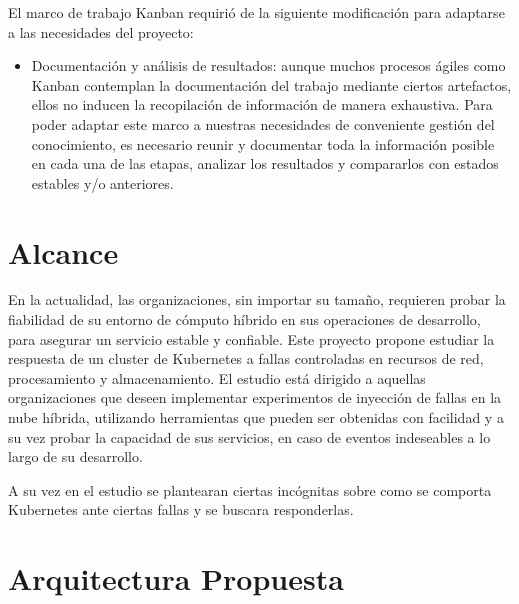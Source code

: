 \par El marco de trabajo Kanban requirió de la siguiente modificación para adaptarse a las necesidades del proyecto:
\begin{itemize}
    \item Documentación y análisis de resultados: aunque muchos procesos ágiles como Kanban contemplan la documentación del trabajo mediante ciertos artefactos, ellos no inducen la recopilación de información de manera exhaustiva. Para poder adaptar este marco a nuestras necesidades de conveniente gestión del conocimiento, es necesario reunir y documentar toda la información posible en cada una de las etapas, analizar los resultados y compararlos con estados estables y/o anteriores. 
\end{itemize}
 
\section{Alcance}


\par En la actualidad, las organizaciones, sin importar su tamaño, requieren probar la fiabilidad de su entorno de cómputo híbrido en sus operaciones de desarrollo, para asegurar un servicio estable y confiable. Este proyecto propone estudiar la respuesta de un cluster de Kubernetes a fallas controladas en recursos de red, procesamiento y almacenamiento. El estudio está dirigido a aquellas organizaciones que deseen implementar experimentos de inyección de fallas en la nube híbrida, utilizando herramientas que pueden ser obtenidas con facilidad y a su vez probar la capacidad de sus servicios, en caso de eventos indeseables a lo largo de su desarrollo. \\

\par A su vez en el estudio se plantearan ciertas incógnitas sobre como se comporta Kubernetes ante ciertas fallas y se buscara responderlas.

\section{Arquitectura Propuesta}

